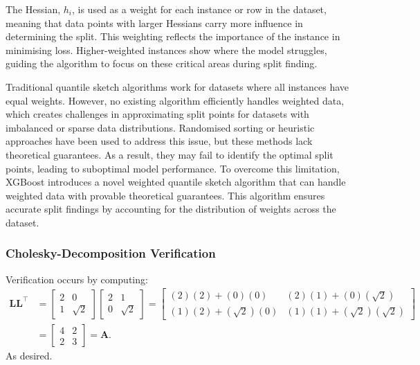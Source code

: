 \documentclass[11pt]{report} %
\begin{document}
The Hessian, \( h_i \), is used as a weight for each instance or row in the dataset, meaning that data points with larger Hessians carry more influence in determining the split. This weighting reflects the importance of the instance in minimising loss. Higher-weighted instances show where the model struggles, guiding the algorithm to focus on these critical areas during split finding.

Traditional quantile sketch algorithms work for datasets where all instances have equal weights.\cite{chen2016xgboost} However, no existing algorithm efficiently handles weighted data, which creates challenges in approximating split points for datasets with imbalanced or sparse data distributions. Randomised sorting or heuristic approaches have been used to address this issue, but these methods lack theoretical guarantees.\cite{chen2016xgboost} As a result, they may fail to identify the optimal split points, leading to suboptimal model performance. To overcome this limitation, XGBoost introduces a novel weighted quantile sketch algorithm that can handle weighted data with provable theoretical guarantees.\cite{chen2016xgboost} This algorithm ensures accurate split findings by accounting for the distribution of weights across the dataset. %
\subsubsection{Cholesky-Decomposition Verification}
\label{CD}
Verification occurs by computing:
\begin{align*}
\mathbf{L} \mathbf{L}^\top 
&= 
\begin{bmatrix}
2 & 0 \\
1 & \sqrt{2}
\end{bmatrix}
\begin{bmatrix}
2 & 1 \\
0 & \sqrt{2}
\end{bmatrix} 
=
\begin{bmatrix}
(2)(2) + (0)(0) & (2)(1) + (0)(\sqrt{2}) \\
(1)(2) + (\sqrt{2})(0) & (1)(1) + (\sqrt{2})(\sqrt{2})
\end{bmatrix} \\[10pt]
&=
\begin{bmatrix}
4 & 2 \\
2 & 3
\end{bmatrix}
= \mathbf{A}.
\end{align*}
\noindent As desired.



\end{document}
